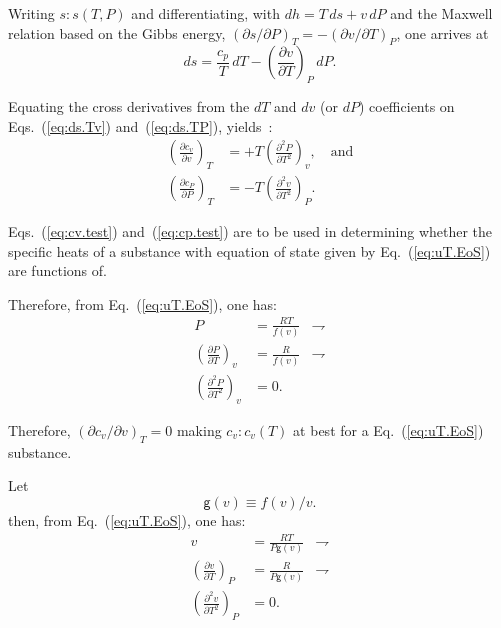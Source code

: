 \documentclass[fleqn,11pt]{SelfArx}
\newcommand{\parxyz}[3]{\left(\frac{\partial {{#1}}}{\partial {{#2}}}\right)_{\!\!\!{#3}}}
\newcommand{\inlxyz}[3]{({\partial {{#1}}}/{\partial {{#2}}})_{{#3}}}
\begin{document}
    Writing $s\!:\!s(T, P)$ and differentiating, with $dh =  T\,ds  +  v\,dP$  and  the  Maxwell
    relation based on the Gibbs energy, $\inlxyz sPT = -\inlxyz vTP$, one arrives at
    \begin{equation}
        ds = \frac{c_p}{T}\,dT - \parxyz vTP\,dP.
        \label{eq:ds.TP}
    \end{equation}

    Equating  the  cross  derivatives  from  the  $dT$  and  $dv$  (or  $dP$)  coefficients   on
    Eqs.~(\ref{eq:ds.Tv}) and~(\ref{eq:ds.TP}), yields~\cite{2013-CengelYA+BolesMA-AMGH}:
    \begin{align}
        \parxyz{c_v}vT & = +T\left(\frac{\partial^2P}{\partial T^2}\right)_{\!\!\!v},
        \quad\mbox{and}\label{eq:cv.test} \\
        \parxyz{c_P}PT & = -T\left(\frac{\partial^2v}{\partial T^2}\right)_{\!\!\!P}.
        \label{eq:cp.test}
    \end{align}

    Eqs.~(\ref{eq:cv.test}) and~(\ref{eq:cp.test}) are to be used  in  determining  whether  the
    specific heats of a substance with equation of  state  given  by  Eq.~(\ref{eq:uT.EoS})  are
    functions of.

    Therefore, from Eq.~(\ref{eq:uT.EoS}), one has:
    \begin{align}
        P & = \frac{RT}{f(v)} & \rightharpoondown \\
        \parxyz PTv & = \frac{R}{f(v)} & \rightharpoondown \\
        \left(\frac{\partial^2P}{\partial T^2}\right)_{\!\!\!v} & = 0.
        \label{eq:cv.test.0}
    \end{align}

    Therefore, $\inlxyz{c_v}vT = 0$ making $c_v\!:\!c_v(T)$ at best for a  Eq.~(\ref{eq:uT.EoS})
    substance.

    Let
    \begin{equation}
        \mathsf{g}(v) \equiv f(v)/v.
        \label{eq:def.g}
    \end{equation}
    \noindent then, from Eq.~(\ref{eq:uT.EoS}), one has:
    \begin{align}
        v & = \frac{RT}{P\mathsf{g}(v)} & \rightharpoondown \\
        \parxyz vTP & = \frac{R}{P\mathsf{g}(v)} & \rightharpoondown
        \label{eq:vTP} \\
        \left(\frac{\partial^2v}{\partial T^2}\right)_{\!\!\!P} & = 0.
        \label{eq:cp.test.0}
    \end{align}
\end{document}

